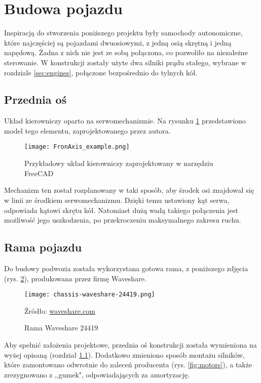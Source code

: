\section{Budowa pojazdu}
\label{sec:building}
    Inspiracją do stworzenia poniższego projektu były samochody autonomiczne, które najczęściej są pojazdami dwuosiowymi, z jedną osią skrętną i jedną napędową.
    Żadna z nich nie jest ze sobą połączona, co pozwoliło na niezależne sterowanie.
    W konstrukcji zostały użyte dwa silniki prądu stałego, wybrane w rozdziale \ref{sec:engines}, połączone bezpośrednio do tylnych kół.
    \subsection{Przednia oś}
    \label{subsec:drive_axis}
        Układ kierowniczy oparto na serwomechanizmie.
        Na rysunku \ref{fig:frontAxis_model} przedstawiono model tego elementu, zaprojektowanego przez autora.

        \begin{figure}[!ht]
            \centering
            \texttt{[image: FronAxis\_example.png]}
            \caption{Przykładowy układ kierowniczy zaprojektowany w narzędziu FreeCAD}
            \label{fig:frontAxis_model}
        \end{figure}
        Mechanizm ten został rozplanowany w taki sposób, aby środek osi znajdował się w linii ze środkiem serwomechanizmu.
        Dzięki temu ustawiony kąt serwa, odpowiada kątowi skrętu kół.
        Natomiast dużą wadą takiego połączenia jest możliwość jego uszkodzenia, po przekroczeniu maksymalnego zakresu ruchu.

    \subsection{Rama pojazdu}
    Do budowy podwozia została wykorzystana gotowa rama, z poniższego zdjęcia (rys. \ref{fig:test_chassis}), produkowana przez firmę Waveshare.
\clearpage
    \begin{figure}[!ht]
        \centering
        \texttt{[image: chassis-waveshare-24419.png]}
        \caption{Rama Waveshare 24419}
        Źródło: \href{https://www.waveshare.com/robot-chassis.htm?sku=24419}{waveshare.com}
        \label{fig:test_chassis}
    \end{figure}

    Aby spełnić założenia projektowe, przednia oś konstrukcji została wymieniona na wyżej opisaną (rozdział \ref{subsec:drive_axis}).
    Dodatkowo zmieniono sposób montażu silników, które zamontowano odwrotnie do zaleceń producenta (rys. \ref{fig:motors}), a także zrezygnowano z ,,gumek", odpowiadających za amortyzację.

